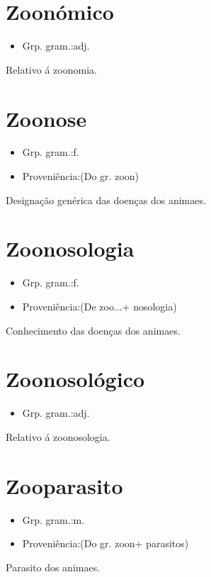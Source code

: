 \section{Zoonómico}
\begin{itemize}
\item {Grp. gram.:adj.}
\end{itemize}
Relativo á zoonomia.
\section{Zoonose}
\begin{itemize}
\item {Grp. gram.:f.}
\end{itemize}
\begin{itemize}
\item {Proveniência:(Do gr. \textunderscore zoon\textunderscore )}
\end{itemize}
Designação genérica das doenças dos animaes.
\section{Zoonosologia}
\begin{itemize}
\item {Grp. gram.:f.}
\end{itemize}
\begin{itemize}
\item {Proveniência:(De \textunderscore zoo...\textunderscore  + \textunderscore nosologia\textunderscore )}
\end{itemize}
Conhecimento das doenças dos animaes.
\section{Zoonosológico}
\begin{itemize}
\item {Grp. gram.:adj.}
\end{itemize}
Relativo á zoonosologia.
\section{Zooparasito}
\begin{itemize}
\item {Grp. gram.:m.}
\end{itemize}
\begin{itemize}
\item {Proveniência:(Do gr. \textunderscore zoon\textunderscore  + \textunderscore parasitos\textunderscore )}
\end{itemize}
Parasito dos animaes.
